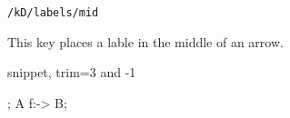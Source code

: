 \begin{lstlisting}
/kD/labels/mid
\end{lstlisting}

This key places a lable in the middle of an arrow.

\begin{tcblisting}{snippet, trim={3 and -1}}
\begin{kodi}
;
\mor [mid] A f:-> B;
\end{kodi}
\end{tcblisting}
